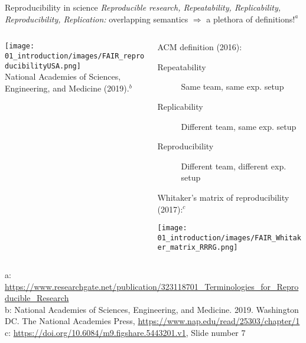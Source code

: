 \begin{frame}{Reproducibility in science}
\textit{Reproducible research, Repeatability, Replicability, Reproducibility, Replication:} overlapping semantics $\Rightarrow$ a plethora of definitions$!^{a}$\\
\begin{columns}
    \begin{column}{3.5cm}
      \begin{center}
      \texttt{[image: 01\_introduction/images/FAIR\_reproducibilityUSA.png]}\\
      National Academies of Sciences, Engineering, and Medicine (2019)$.^{b}$
      \end{center}
    \end{column}
    \begin{column}{8.5cm}
      ACM definition (2016):
      \begin{description}
          \item [Repeatability] Same team, same exp. setup
          \item [Replicability] Different team, same exp. setup
          \item [Reproducibility] Different team, different exp. setup
      \end{description}
      \vfill
      Whitaker's matrix of reproducibility (2017)$:^{c}$
      \begin{center}
         \texttt{[image: 01\_introduction/images/FAIR\_Whitaker\_matrix\_RRRG.png]}\\
      \end{center}
    \end{column}
\end{columns}
\tiny{a: \url{https://www.researchgate.net/publication/323118701_Terminologies_for_Reproducible_Research}\\
      b: National Academies of Sciences, Engineering, and Medicine. 2019. Washington DC. The National Academies Press, \url{https://www.nap.edu/read/25303/chapter/1}\\
      c: \url{https://doi.org/10.6084/m9.figshare.5443201.v1}, Slide number 7}
\end{frame}
